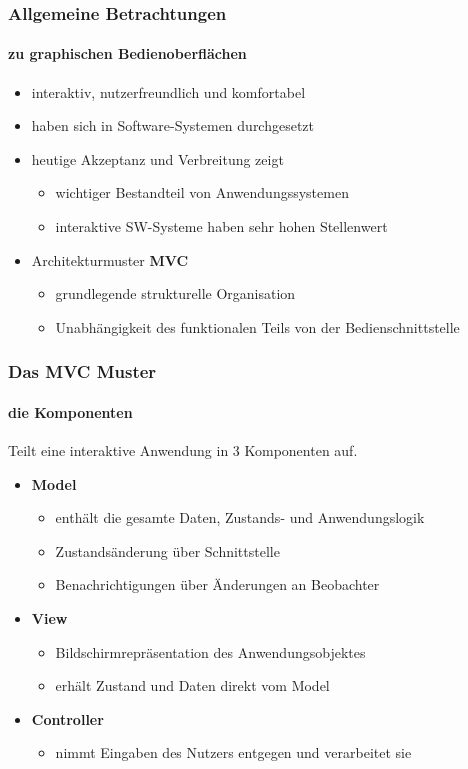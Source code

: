 \begin{frame}
	\frametitle{Allgemeine Betrachtungen}
	\framesubtitle{zu graphischen Bedienoberflächen}
	\begin{itemize}
		\item interaktiv, nutzerfreundlich und komfortabel
		\item haben sich in Software-Systemen durchgesetzt
		\item heutige Akzeptanz und Verbreitung zeigt
		\begin{itemize}
			\item wichtiger Bestandteil von Anwendungssystemen
			\item interaktive SW-Systeme haben sehr hohen Stellenwert
		\end{itemize}
		\item Architekturmuster {\bf MVC}
		\begin{itemize}
			\item grundlegende strukturelle Organisation
			\item Unabhängigkeit des funktionalen Teils von
			der Bedienschnittstelle
		\end{itemize}
	\end{itemize}
\end{frame}

\begin{frame}
	\frametitle{Das MVC Muster}
	\framesubtitle{die Komponenten}
	\begin{center}
		Teilt eine interaktive Anwendung in 3 Komponenten auf.
	\end{center}
	\begin{itemize}
		\item {\bf Model}
		\begin{itemize}
			\item enthält die gesamte Daten, Zustands- und Anwendungslogik
			\item Zustandsänderung über Schnittstelle
			\item Benachrichtigungen über Änderungen an Beobachter
		\end{itemize}
		\item {\bf View}
		\begin{itemize}
			\item Bildschirmrepräsentation des Anwendungsobjektes
			\item erhält Zustand und Daten direkt vom Model
		\end{itemize}
		\item {\bf Controller}
		\begin{itemize}
			\item nimmt Eingaben des Nutzers entgegen und verarbeitet sie
		\end{itemize}
	\end{itemize}
\end{frame}

